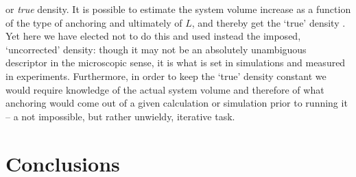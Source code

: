 \documentclass[aps,pre,twocolumn,groupedaddress,showpacs]{revtex4}
\begin{document}
or {\it true} density. It is possible to estimate the system volume increase 
as a function of the type of anchoring and ultimately of $L$, and thereby 
get the `true' density \cite{Barmes:2003}. Yet here we have elected not to 
do this and used instead the imposed, `uncorrected' density: though it
may not be an absolutely unambiguous descriptor in the microscopic sense,
it is what is set in simulations and measured in experiments. Furthermore,
in order to keep the `true' density constant we would require knowledge of
the actual system volume and therefore of what anchoring would come out of 
a given calculation or simulation prior to running it -- a not impossible, 
but rather unwieldy, iterative task.


\section{Conclusions}

\label{sect-concl}
\end{document}

